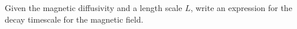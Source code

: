 
    Given the magnetic diffusivity and a length scale $L$, write an expression for the
    decay timescale for the magnetic field.


